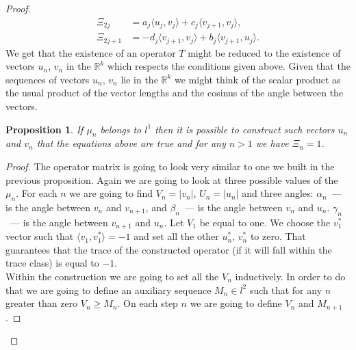 \documentclass[12pt]{article}
\renewcommand{\geq}{\geqslant}
\newtheorem{prop}{Proposition}
\theoremstyle{definition}
\numberwithin{remark}{section}
\numberwithin{theorem}{section}
\numberwithin{prop}{section}
\numberwithin{equation}{section}
\numberwithin{lemma}{section}
\numberwithin{prop_under_lemma}{lemma}
\begin{document}
\begin{proof}
        \begin{align*}
            \Xi_{2j} &= a_{j} \langle u_{j}, v_{j} \rangle  + c_{j} \langle v_{j+1}, v_{j} \rangle,\\
            \Xi_{2j + 1} &= -d_{j} \langle v_{j+1}, v_{j} \rangle + b_{j} \langle v_{j+1}, u_{j}\rangle.
        \end{align*}
        We get that the existence of an operator $T$
        might be reduced to the existence of vectors $u_n$, $v_n$ in the $\mathbb{R}^k$ which
        respects the conditions given above.
        Given that the sequences of vectors $u_n$, $v_n$ lie in the $\mathbb{R}^k$ we might think of the scalar product as
        the usual product of the vector lengths and the cosinus of the angle between the vectors.
        \begin{prop}
            \label{k-dim-statement}
            If $\mu_n$ belongs to $l^1$ then it is possible to construct such vectors $u_n$ and $v_n$ that the equations above are true and for any $n > 1$ we have $\Xi_n = 1$.
        \end{prop}
        \begin{proof}
            The operator matrix is going to look very similar to one we built in the previous proposition.
            Again we are going to look at three possible values of the $\mu_n$.
            For each $n$ we are going to find $V_n = |v_n|$, $U_n = |u_n|$ and three angles:
            $\alpha_n$~--- is the angle between $v_n$ and $v_{n + 1}$, and
            $\beta_n$~--- is the angle between $v_n$ and $u_n$.
            $\gamma_n$~--- is the angle between $v_{n + 1}$ and $u_n$.
            Let $V_1$ be equal to one.
            We choose the $v^*_1$ vector such that $\langle v_1, v^*_1 \rangle = -1$ and set all
            the other $u^*_n$, $v^*_n$ to zero. That guarantees that the trace of the constructed operator (if it
            will fall within the trace class) is equal to $-1$.\\
            Within the construction we are going to set all the $V_n$ inductively. In order to do
            that we are going to define an auxiliary sequence $M_n \in l^2$ such that for any $n$ greater than zero
            $V_n \geq M_n$. On each step $n$ we are going to define $V_n$ and $M_{n+1}$.
            

\end{proof}
\end{proof}
\end{document}
